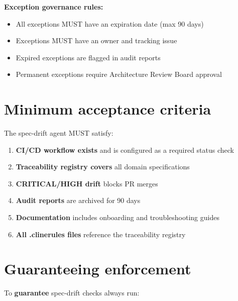 \textbf{Exception governance rules:}
\begin{itemize}
  \item All exceptions MUST have an expiration date (max 90 days)
  \item Exceptions MUST have an owner and tracking issue
  \item Expired exceptions are flagged in audit reports
  \item Permanent exceptions require Architecture Review Board approval
\end{itemize}

\section{Minimum acceptance criteria}

The spec-drift agent MUST satisfy:

\begin{enumerate}
  \item \textbf{CI/CD workflow exists} and is configured as a required status check
  \item \textbf{Traceability registry covers} all domain specifications
  \item \textbf{CRITICAL/HIGH drift} blocks PR merges
  \item \textbf{Audit reports} are archived for 90 days
  \item \textbf{Documentation} includes onboarding and troubleshooting guides
  \item \textbf{All .clinerules files} reference the traceability registry
\end{enumerate}

\section{Guaranteeing enforcement}
\label{sec:guarantee}

To \textbf{guarantee} spec-drift checks always run:

